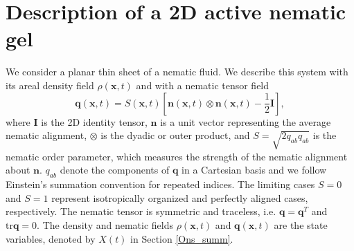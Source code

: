 \documentclass[12pt]{iopart}
\begin{document}
	
	
	
	\section{Description of a 2D active nematic gel} \label{sec_1}
	
	We consider a planar thin sheet of a nematic fluid. We describe this system with its areal density field $\rho(\bm{x},t)$ and with a nematic tensor field 
	\begin{equation} 
		\label{eq:nematic_tensor}
		\bm{q}(\bm{x},t) =S(\bm{x},t) \left[\bm{n}(\bm{x},t) \otimes \bm{n}(\bm{x},t) - \frac{1}{2}\bm{I}\right] ,
	\end{equation}
	where $\bm{I}$ is the 2D identity tensor, $\bm{n}$ is a unit vector representing the average nematic alignment, $\otimes$ is the dyadic or outer product, and $S=\sqrt{2 q_{ab}q_{ab}}$ is the nematic order parameter, which measures the strength of the nematic alignment about $\bm{n}$. $q_{ab}$ denote the components of $\bm{q}$ in a Cartesian basis and we follow Einstein's summation convention for repeated indices. 
	The limiting cases $\textit{S}=0$ and $\textit{S}=1$ represent isotropically organized and perfectly aligned cases, respectively. The nematic tensor is symmetric and traceless, i.e. $\bm{q}=\bm{q}^T$ and $\text{tr}\bm{q}=0$. The density and nematic fields $\rho(\bm{x},t)$ and $\bm{q}(\bm{x},t)$ are the state variables, denoted by $X(t)$ in Section \ref{Ons_summ}.
	
\end{document}
